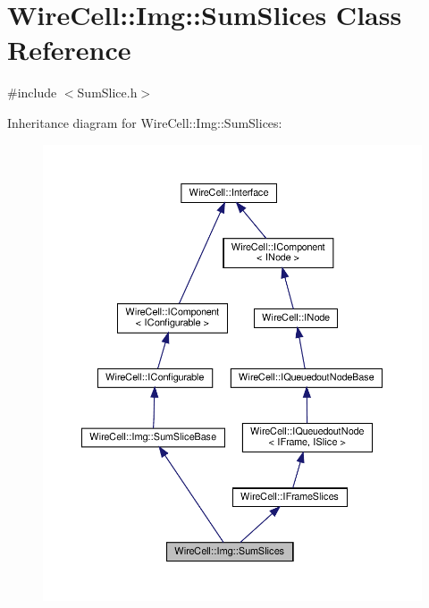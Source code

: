 \hypertarget{class_wire_cell_1_1_img_1_1_sum_slices}{}\section{Wire\+Cell\+:\+:Img\+:\+:Sum\+Slices Class Reference}
\label{class_wire_cell_1_1_img_1_1_sum_slices}


{\ttfamily \#include $<$Sum\+Slice.\+h$>$}



Inheritance diagram for Wire\+Cell\+:\+:Img\+:\+:Sum\+Slices\+:
\nopagebreak
\begin{figure}[H]
\begin{center}
\leavevmode
\includegraphics[width=350pt]{class_wire_cell_1_1_img_1_1_sum_slices__inherit__graph}
\end{center}
\end{figure}



